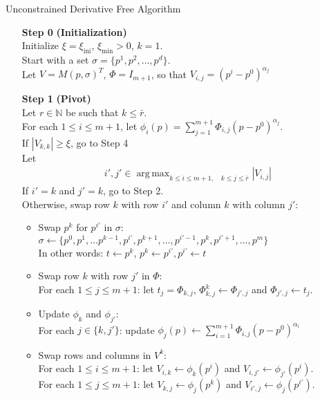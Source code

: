 \documentclass{article}
\theoremstyle{case}
\DeclareMathOperator*{\argmax}{arg\,max}
\newcommand{\naturals}{\mathbb N}
\newcommand{\ximin}{{\xi_{\textrm{min}}}}
\newcommand{\xiini}{{\xi_{\textrm{ini}}}}
\begin{document}
\newpage
\begin{algorithm}[H]
    \caption{Unconstrained Derivative Free Algorithm}
    \label{full_pivot_model_improve}
    \begin{itemize}
        \item[\textbf{Step 0}] \textbf{(Initialization)} \\
            Initialize $\xi = \xiini$, $\ximin > 0$, $k=1$. \\
            Start with a set $\sigma = \{p^1, p^2, \ldots, p^d\}$. \\
            Let $V = M(p, \sigma)^T$, $\Phi = I_{m+1}$, so that $V_{i,j} = (p^i - p^0)^{\alpha_j}$
            
        \item[\textbf{Step 1}] \textbf{(Pivot)} \\
        	Let $r \in \naturals$ be such that $k \le \bar r$. \\
        	For each $1\le i \le m+1$, let $\phi_i(p) = \sum_{j=1}^{m+1} \Phi_{i, j} (p - p^0)^{\alpha_j}$. \\
        	If $|V_{k,k}| \ge \xi$, go to Step 4 \\
        	Let 
\begin{align*}
	i', j' \in \argmax_{k\le i \le m+1, \quad k \le j \le \bar r} |V_{i, j}|
\end{align*}
			If $i' = k$ and $j' = k$, go to Step 2. \\
			Otherwise, swap row $k$ with row $i'$ and column $k$ with column $j'$:
			\begin{itemize}
				\item Swap $p^k$ for $p^{i'}$ in $\sigma$: \\
					$\sigma \gets \{p^0, p^1, \ldots p^{k-1}, p^{i'}, p^{k+1}, \ldots, p^{i'-1}, p^{k}, p^{i'+1}, \ldots, p^m\}$ \\
					In other words: $t \gets p^k$, $p^k \gets p^{i'}, p^{i'} \gets t$
				\item Swap row $k$ with row $j'$ in $\Phi$: \\
					For each $1 \le j \le m+1$: let $t_j = \Phi_{k, j}$, $\Phi^k_{k, j} \gets \Phi_{j', j}$ and $\Phi_{j', j} \gets t_j$.
				\item Update $\phi_k$ and $\phi_{j'}$: \\
					For each $j \in \{k, j'\}$: update $\phi_j(p) \gets \sum_{i=1}^{m+1} \Phi_{i, j} (p - p^0)^{\alpha_i}$
				\item Swap rows and columns in $V^k$:\\
					For each $1 \le i \le m+1$: let $V_{i, k} \gets \phi_k(p^i)$ and $V_{i, j'} \gets \phi_{j'}(p^i)$.\\ 
					For each $1 \le j \le m+1$: let $V_{k, j} \gets \phi_j(p^k)$ and $V_{i', j} \gets \phi_{j}(p^{i'})$.
			\end{itemize}
			

\end{itemize}
\end{algorithm}
\end{document}

